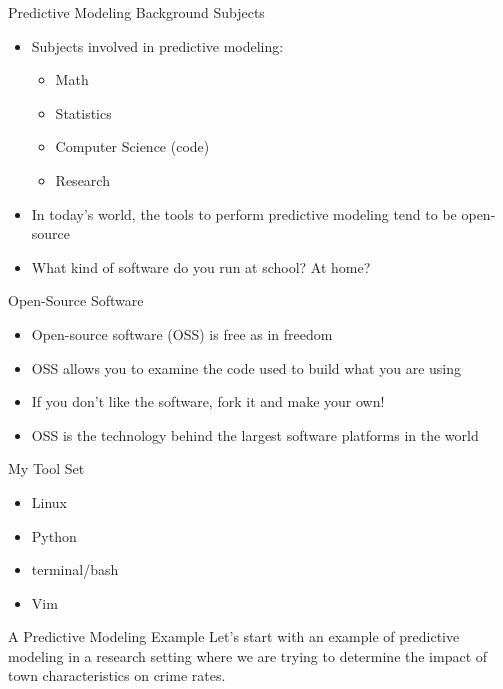 \documentclass[10pt]{beamer}
\begin{document}
\begin{frame}[t]{Predictive Modeling Background Subjects}
  \begin{itemize}
    \item Subjects involved in predictive modeling:
    \begin{itemize}
      \item Math
      \item Statistics
      \item Computer Science (code)
      \item Research
    \end{itemize}
    \item In today's world, the tools to perform predictive modeling tend to be
      open-source
    \item What kind of software do you run at school? At home?
  \end{itemize}
\end{frame}

\begin{frame}[t]{Open-Source Software}
  \begin{itemize}
    \item Open-source software (OSS) is free as in freedom
    \item OSS allows you to examine the code used to build what you are using
    \item If you don't like the software, fork it and make your own!
    \item OSS is the technology behind the largest software platforms in the
      world
  \end{itemize}
\end{frame}

\begin{frame}[t]{My Tool Set}
  \begin{itemize}
    \item Linux
    \item Python
    \item terminal/bash
    \item Vim
  \end{itemize}
\end{frame}

\begin{frame}[t]{A Predictive Modeling Example}
  Let's start with an example of predictive modeling in a research setting
  where we are trying to determine the impact of town characteristics on crime
  rates.
\end{frame}
\end{document}
